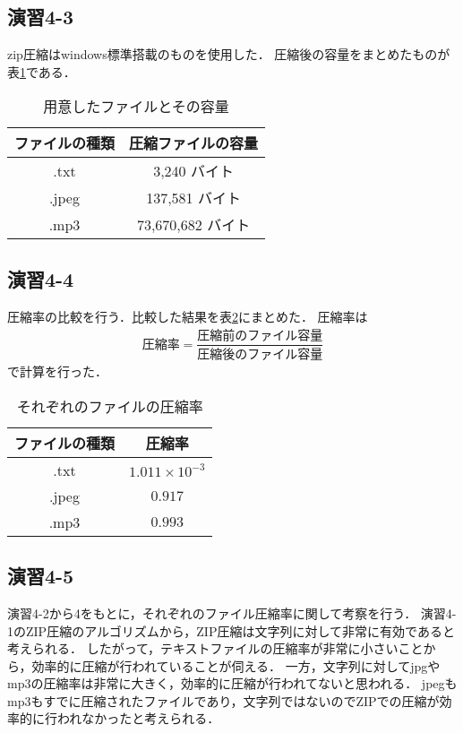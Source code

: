 \documentclass[documentclass]{jsarticle}
\begin{document}
\subsection*{演習4-3}
zip圧縮はwindows標準搭載のものを使用した．
圧縮後の容量をまとめたものが表\ref*{tb:4-2}である．
\begin{table}[h]
  \begin{center}
    \caption{用意したファイルとその容量}
    \label{tb:4-2}
    \begin{tabular}{|cc|} \hline
     ファイルの種類 & 圧縮ファイルの容量 \\ \hline
     .txt    & 3,240 バイト \\
     .jpeg   & 137,581  バイト \\
     .mp3    & 73,670,682  バイト \\ \hline
    \end{tabular}
  \end{center}
\end{table}

\subsection*{演習4-4}
圧縮率の比較を行う．比較した結果を表\ref*{tb:4-3}にまとめた．
圧縮率は
\begin{align*}
  圧縮率 = \dfrac{圧縮前のファイル容量}{圧縮後のファイル容量}
\end{align*}
で計算を行った．
\begin{table}[h]
  \begin{center}
    \caption{それぞれのファイルの圧縮率}
    \label{tb:4-3}
    \begin{tabular}{|cc|} \hline
     ファイルの種類 & 圧縮率 \\ \hline
     .txt    &  $1.011 \times 10^{-3}$\\
     .jpeg   & $0.917$ \\
     .mp3    & $0.993$ \\ \hline
    \end{tabular}
  \end{center}
\end{table}

\subsection*{演習4-5}
演習4-2から4をもとに，それぞれのファイル圧縮率に関して考察を行う．
演習4-1のZIP圧縮のアルゴリズムから，ZIP圧縮は文字列に対して非常に有効であると考えられる．
したがって，テキストファイルの圧縮率が非常に小さいことから，効率的に圧縮が行われていることが伺える．
一方，文字列に対してjpgやmp3の圧縮率は非常に大きく，効率的に圧縮が行われてないと思われる．
jpegもmp3もすでに圧縮されたファイルであり，文字列ではないのでZIPでの圧縮が効率的に行われなかったと考えられる．
\end{document}
